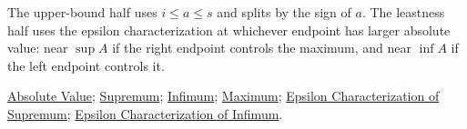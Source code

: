 \begin{remark*}
The upper-bound half uses $i\le a\le s$ and splits by the sign of $a$. The
leastness half uses the epsilon characterization at whichever endpoint has
larger absolute value: near $\sup A$ if the right endpoint controls the
maximum, and near $\inf A$ if the left endpoint controls it.
\end{remark*}

\begin{dependencies}
\hyperref[def:absolute-value]{Absolute Value};
\hyperref[def:supremum]{Supremum};
\hyperref[def:infimum]{Infimum};
\hyperref[def:maximum]{Maximum};
\hyperref[def:epsilon-characterization-of-supremum]{Epsilon Characterization of Supremum};
\hyperref[def:epsilon-characterization-of-infimum]{Epsilon Characterization of Infimum}.
\end{dependencies}

\clearpage
